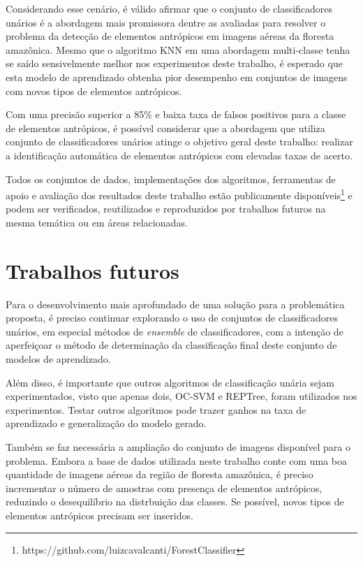 Considerando esse cenário, é válido afirmar que o conjunto de classificadores unários é a abordagem mais promissora dentre as avaliadas para resolver o problema da detecção de elementos antrópicos em imagens aéreas da floresta amazônica. Mesmo que o algoritmo KNN em uma abordagem multi-classe tenha se saído sensivelmente melhor nos experimentos deste trabalho, é esperado que esta modelo de aprendizado obtenha pior desempenho em conjuntos de imagens com novos tipos de elementos antrópicos.

Com uma precisão superior a 85\% e baixa taxa de falsos positivos para a classe de elementos antrópicos, é possível considerar que a abordagem que utiliza conjunto de classificadores unários atinge o objetivo geral deste trabalho: realizar a identificação automática de elementos antrópicos com elevadas taxas de acerto.

Todos os conjuntos de dados, implementações dos algoritmos, ferramentas de apoio e avaliação dos resultados deste trabalho estão publicamente disponíveis\footnote{https://github.com/luizcavalcanti/ForestClassifier} e podem ser verificados, reutilizados e reproduzidos por trabalhos futuros na mesma temática ou em áreas relacionadas.

\section{Trabalhos futuros}

Para o desenvolvimento mais aprofundado de uma solução para a problemática proposta, é preciso continuar explorando o uso de conjuntos de classificadores unários, em especial métodos de \textit{ensemble} de classificadores, com a intenção de aperfeiçoar o método de determinação da classificação final deste conjunto de modelos de aprendizado.

Além disso, é importante que outros algoritmos de classificação unária sejam experimentados, visto que apenas dois, OC-SVM e REPTree, foram utilizados nos experimentos. Testar outros algoritmos pode trazer ganhos na taxa de aprendizado e generalização do modelo gerado.

Também se faz necessária a ampliação do conjunto de imagens disponível para o problema. Embora a base de dados utilizada neste trabalho conte com uma boa quantidade de imagens aéreas da região de floresta amazônica, é preciso incrementar o número de amostras com presença de elementos antrópicos, reduzindo o desequilíbrio na distrbuição das classes. Se possível, novos tipos de elementos antrópicos precisam ser inseridos.